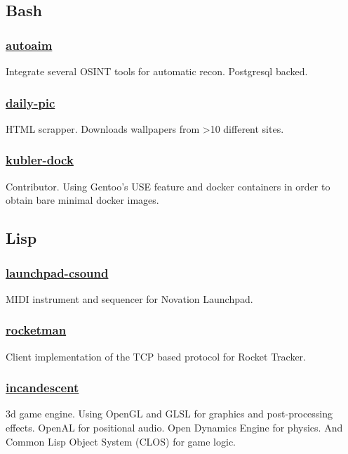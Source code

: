 \documentclass[11pt]{article}
\begin{document}
\subsection{Bash}
\subsubsection{\href {https://github.com/azimut/autoaim} {autoaim}}
Integrate several OSINT tools for automatic recon. Postgresql backed.
\subsubsection{\href {https://github.com/azimut/daily-pic} {daily-pic}}
HTML scrapper. Downloads wallpapers from >10 different sites.
\subsubsection{\href {https://github.com/azimut/kubler-dock} {kubler-dock}}
Contributor. Using Gentoo's USE feature and docker containers in order to obtain bare minimal docker images.

\subsection{Lisp}
\subsubsection{\href {https://github.com/azimut/launchpad-csound} {launchpad-csound}}
MIDI instrument and sequencer for Novation Launchpad.
\subsubsection{\href {https://github.com/azimut/rocketman} {rocketman}}
Client implementation of the TCP based protocol for Rocket Tracker.
\subsubsection{\href {https://github.com/azimut/incandescent} {incandescent}}
3d game engine. Using OpenGL and GLSL for graphics and post-processing effects. OpenAL for positional audio. Open Dynamics Engine for physics. And Common Lisp Object System (CLOS) for game logic.
\end{document}
